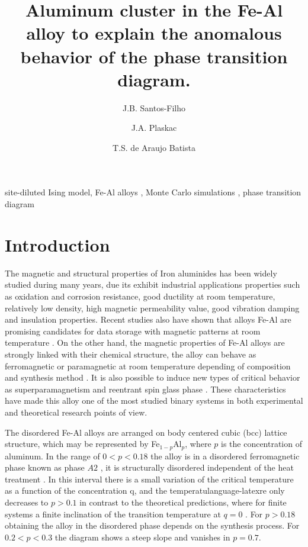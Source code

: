 \documentclass[twocolumn,5p,12pt]{elsarticle}
\author[1]{J.B. Santos-Filho\corref{mycorrespondingauthor}}
\author[1]{J.A. Plaskac}
\author[2]{T.S. de Araujo Batista}
\author[1]{}
\author[1]{}
\begin{document}
\begin{frontmatter}

\title{Aluminum cluster in the Fe-Al alloy to explain the anomalous behavior of the phase transition diagram.}


\begin{abstract}
%
%
\end{abstract}

\begin{keyword}
site-diluted Ising model\sep
Fe-Al alloys  \sep
Monte Carlo simulations \sep
phase transition diagram
\end{keyword}
\end{frontmatter}


\section{Introduction}

The magnetic and structural properties of Iron aluminides has been widely studied during many years\cite{Domb1983, Kubaschewski1982}, due its exhibit industrial applications properties such as oxidation and corrosion resistance, good ductility at room temperature, relatively low density, high magnetic permeability value, good vibration damping and insulation properties. Recent studies also have shown that alloys Fe-Al are promising candidates for data storage with magnetic patterns at room temperature \cite{Menendez2009,Bali2014}.  On the other hand, the magnetic properties of Fe-Al alloys are strongly linked with their chemical structure, the alloy can behave as ferromagnetic or paramagnetic at room temperature   depending of composition and synthesis method \cite{Wolf11986,Besnus1975,Dias2009,Oubelkacem2010}. It is also possible to induce new types of critical behavior as superparamagnetism and reentrant spin glass phase \cite{Arrott1959,Shull1959,Boni1986,Takahashi1996}. These characteristics have made this alloy one of the most studied binary systems in both experimental and theoretical research points of view.

	The disordered Fe-Al alloys are arranged on body centered cubic (bcc)  lattice structure, which may be represented by Fe$_{1-p}$Al$_{p}$, where $p$ is the concentration of aluminum. In the range of $0 <p <0.18$ the alloy is in a disordered ferromagnetic phase known as phase $A2$ \cite{Sort2006,Trautvetter2011,Zamora2009}, it is structurally disordered independent of the heat treatment \cite{Kubaschewski1982}. In this interval there is a small variation of the critical temperature as a function of the concentration q, and the temperatulanguage-latexre only decreases to $p> 0.1$ in contrast to the theoretical predictions, where for finite systems a finite inclination of the transition temperature at $q = 0$ \cite{Domb1983}. For $p> 0.18$ obtaining the alloy in the disordered phase depends on the synthesis process. For $0.2<  p <0.3$ the diagram shows a steep slope and vanishes in  $p = 0.7$.
\end{document}
